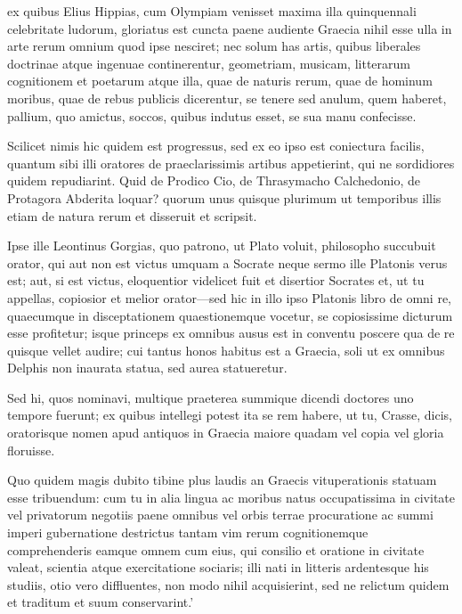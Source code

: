  ex quibus Elius Hippias, cum Olympiam venisset maxima illa quinquennali celebritate ludorum, gloriatus est cuncta paene audiente Graecia nihil esse ulla in arte rerum omnium quod ipse nesciret; nec solum has artis, quibus liberales doctrinae atque ingenuae continerentur, geometriam, musicam, litterarum cognitionem et poetarum atque illa, quae de naturis rerum, quae de hominum moribus, quae de rebus publicis dicerentur, se tenere sed anulum, quem haberet, pallium, quo amictus, soccos, quibus indutus esset, se sua manu confecisse.

 Scilicet nimis hic quidem est progressus, sed ex eo ipso est coniectura facilis, quantum sibi illi oratores de praeclarissimis artibus appetierint, qui ne sordidiores quidem repudiarint. Quid de Prodico Cio, de Thrasymacho Calchedonio, de Protagora Abderita loquar? quorum unus quisque plurimum ut temporibus illis etiam de natura rerum et disseruit et scripsit.

 Ipse ille Leontinus Gorgias, quo patrono, ut Plato voluit, philosopho succubuit orator, qui aut non est victus umquam a Socrate neque sermo ille Platonis verus est; aut, si est victus, eloquentior videlicet fuit et disertior Socrates et, ut tu appellas, copiosior et melior orator—sed hic in illo ipso Platonis libro de omni re, quaecumque in disceptationem quaestionemque vocetur, se copiosissime dicturum esse profitetur; isque princeps ex omnibus ausus est in conventu poscere qua de re quisque vellet audire; cui tantus honos habitus est a Graecia, soli ut ex omnibus Delphis non inaurata statua, sed aurea statueretur.

 Sed hi, quos nominavi, multique praeterea summique dicendi doctores uno tempore fuerunt; ex quibus intellegi potest ita se rem habere, ut tu, Crasse, dicis, oratorisque nomen apud antiquos in Graecia maiore quadam vel copia vel gloria floruisse.

 Quo quidem magis dubito tibine plus laudis an Graecis vituperationis statuam esse tribuendum: cum tu in alia lingua ac moribus natus occupatissima in civitate vel privatorum negotiis paene omnibus vel orbis terrae procuratione ac summi imperi gubernatione destrictus tantam vim rerum cognitionemque comprehenderis eamque omnem cum eius, qui consilio et oratione in civitate valeat, scientia atque exercitatione sociaris; illi nati in litteris ardentesque his studiis, otio vero diffluentes, non modo nihil acquisierint, sed ne relictum quidem et traditum et suum conservarint.'

